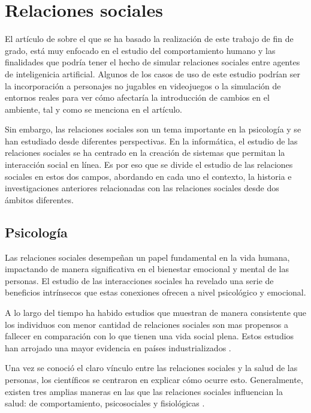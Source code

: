 \section{Relaciones sociales}

El artículo de \cite{park2023generative} sobre el que se ha basado la realización de este trabajo de fin de grado, está muy enfocado en el estudio del comportamiento humano y las finalidades que podría tener el hecho de simular relaciones sociales entre agentes de inteligenicia artificial. Algunos de los casos de uso de este estudio podrían ser la incorporación a personajes no jugables en videojuegos o la simulación de entornos reales para ver cómo afectaría la introducción de cambios en el ambiente, tal y como se menciona en el artículo.

Sin embargo, las relaciones sociales son un tema importante en la psicología y se han estudiado desde diferentes perspectivas. En la informática, el estudio de las relaciones sociales se ha centrado en la creación de sistemas que permitan la interacción social en línea. Es por eso que se divide el estudio de las relaciones sociales en estos dos campos, abordando en cada uno el contexto, la historia e investigaciones anteriores relacionadas con las relaciones sociales desde dos ámbitos diferentes.

\subsection{Psicología}

Las relaciones sociales desempeñan un papel fundamental en la vida humana, impactando de manera significativa en el bienestar emocional y mental de las personas. El estudio de las interacciones sociales ha revelado una serie de beneficios intrínsecos que estas conexiones ofrecen a nivel psicológico y emocional.

A lo largo del tiempo ha habido estudios que muestran de manera consistente que los individuos con menor cantidad de relaciones sociales son mas propensos a fallecer en comparación con lo que tienen una vida social plena. Estos estudios han arrojado una mayor evidencia en países industrializados \citep{House1988}.

Una vez se conoció el claro vínculo entre las relaciones sociales y la salud de las personas, los científicos se centraron en explicar cómo ocurre esto. Generalmente, existen tres amplias maneras en las que las relaciones sociales influencian la salud: de comportamiento, psicosociales y fisiológicas \citep{doi:10.1177/0022146510383501}.

